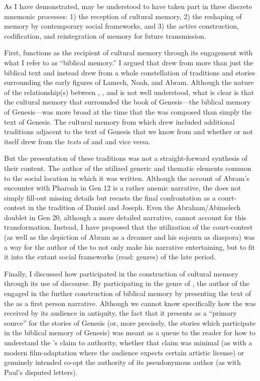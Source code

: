 As I have demonstrated, \ga may be understood to have taken part in three discrete mnemonic processes: 1) the reception of cultural memory, 2) the reshaping of memory by contemporary social frameworks, and 3) the active construction, codification, and reintegration of memory for future transmission. 

First, \ga functions as the recipient of cultural memory through its engagement with what I refer to as  ``biblical memory.'' I argued that \ga drew from more than just the biblical text and instead drew from a whole constellation of traditions and stories surrounding the early figures of Lamech, Noah, and Abram. Although the nature of the relationship(s) between \firstenoch, \jub, and \ga is not well understood, what is clear is that the cultural memory that surrounded the book of Genesis---the biblical memory of Genesis---was more broad at the time that the \ga was composed than simply the text of Genesis. The cultural memory from which \ga drew included additional traditions adjacent to the text of Genesis that we know from \jub and \firstenoch whether or not \ga itself drew from the \emph{texts} of \jub and \firstenoch and vice versa.


But the presentation of these traditions was not a straight-forward synthesis of their content. The author of the \ga utilized generic and thematic elements common to the social location in which it was written. Although the account of Abram's encounter with Pharoah in Gen 12 is a rather anemic narrative, the \ga does not simply fill-out missing details but recasts the final confrontation as a court-contest in the tradition of Daniel and Joseph. Even the Abraham/Abimelech doublet in Gen 20, although a more detailed narrative, cannot account for this transformation. Instead, I have proposed that the utilization of the court-contest (as well as the depiction of Abram as a dreamer and his sojourn as diaspora) was a way for the author of the \ga to not only make his narrative entertaining, but to fit it into the extant social frameworks (read: genres) of the late \secondtemple period.

Finally, I discussed how \ga participated in the construction of cultural memory through its use of \psgraphical discourse. By participating in the genre of \psy, the author of the \ga engaged in the further construction of biblical memory by presenting the text of the \ga as a first person narrative. Although we cannot know specifically how the \ga was received by its audience in antiquity, the fact that it presents as a ``primary source'' for the stories of Genesis (or, more precisely, the stories which participate in the biblical memory of Genesis) was meant as a queue to the reader for how to understand the \ga's claim to authority, whether that claim was minimal (as with a modern film-adaptation where the audience expects certain artistic license) or genuinely intended co-opt the authority of its pseudonymous author (as with Paul's disputed letters).

